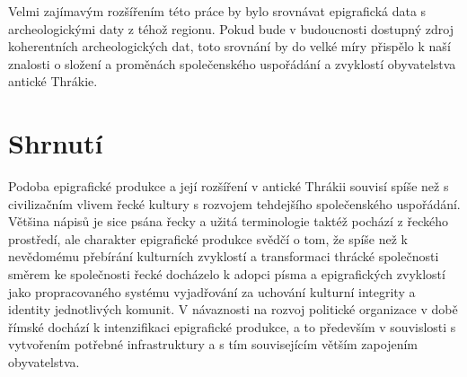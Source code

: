 Velmi zajímavým rozšířením této práce by bylo srovnávat epigrafická data s archeologickými daty z téhož regionu. Pokud bude v budoucnosti dostupný zdroj koherentních archeologických dat, toto srovnání by do velké míry přispělo k naší znalosti o složení a proměnách společenského uspořádání a zvyklostí obyvatelstva antické Thrákie.

\section[shrnutí-26]{Shrnutí}

Podoba epigrafické produkce a její rozšíření v antické Thrákii souvisí spíše než s civilizačním vlivem řecké kultury s rozvojem tehdejšího společenského uspořádání. Většina nápisů je sice psána řecky a užitá terminologie taktéž pochází z řeckého prostředí, ale charakter epigrafické produkce svědčí o tom, že spíše než k nevědomému přebírání kulturních zvyklostí a transformaci thrácké společnosti směrem ke společnosti řecké docházelo k adopci písma a epigrafických zvyklostí jako propracovaného systému vyjadřování za uchování kulturní integrity a identity jednotlivých komunit. V návaznosti na rozvoj politické organizace v době římské dochází k intenzifikaci epigrafické produkce, a to především v souvislosti s vytvořením potřebné infrastruktury a s tím souvisejícím větším zapojením obyvatelstva.
